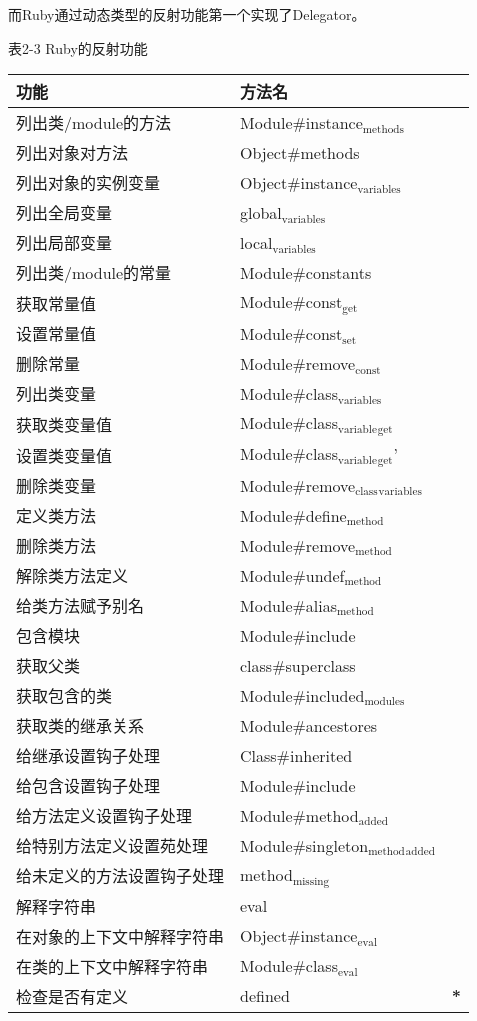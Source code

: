 \documentclass[11pt]{ctexart}
\begin{document}
而Ruby通过动态类型的反射功能第一个实现了Delegator。

表2-3 Ruby的反射功能
\begin{center}
\begin{tabular}{lll}
功能 & 方法名 & \\
\hline
列出类/module的方法 & Module\#instance\(_{\text{methods}}\) & \\
列出对象对方法 & Object\#methods & \\
列出对象的实例变量 & Object\#instance\(_{\text{variables}}\) & \\
列出全局变量 & global\(_{\text{variables}}\) & \\
列出局部变量 & local\(_{\text{variables}}\) & \\
列出类/module的常量 & Module\#constants & \\
获取常量值 & Module\#const\(_{\text{get}}\) & \\
设置常量值 & Module\#const\(_{\text{set}}\) & \\
删除常量 & Module\#remove\(_{\text{const}}\) & \\
列出类变量 & Module\#class\(_{\text{variables}}\) & \\
获取类变量值 & Module\#class\(_{\text{variable}}\)\(_{\text{get}}\) & \\
设置类变量值 & Module\#class\(_{\text{variable}}\)\(_{\text{get}}\)' & \\
删除类变量 & Module\#remove\(_{\text{class}}\)\(_{\text{variables}}\) & \\
定义类方法 & Module\#define\(_{\text{method}}\) & \\
删除类方法 & Module\#remove\(_{\text{method}}\) & \\
解除类方法定义 & Module\#undef\(_{\text{method}}\) & \\
给类方法赋予别名 & Module\#alias\(_{\text{method}}\) & \\
包含模块 & Module\#include & \\
获取父类 & class\#superclass & \\
获取包含的类 & Module\#included\(_{\text{modules}}\) & \\
获取类的继承关系 & Module\#ancestores & \\
给继承设置钩子处理 & Class\#inherited & \\
给包含设置钩子处理 & Module\#include & \\
给方法定义设置钩子处理 & Module\#method\(_{\text{added}}\) & \\
给特别方法定义设置苑处理 & Module\#singleton\(_{\text{method}}\)\(_{\text{added}}\) & \\
给未定义的方法设置钩子处理 & method\(_{\text{missing}}\) & \\
解释字符串 & eval & \\
在对象的上下文中解释字符串 & Object\#instance\(_{\text{eval}}\) & \\
在类的上下文中解释字符串 & Module\#class\(_{\text{eval}}\) & \\
检查是否有定义 & defined & \textbf{*}\\
\hline
\end{tabular}
\end{center}
\end{document}
